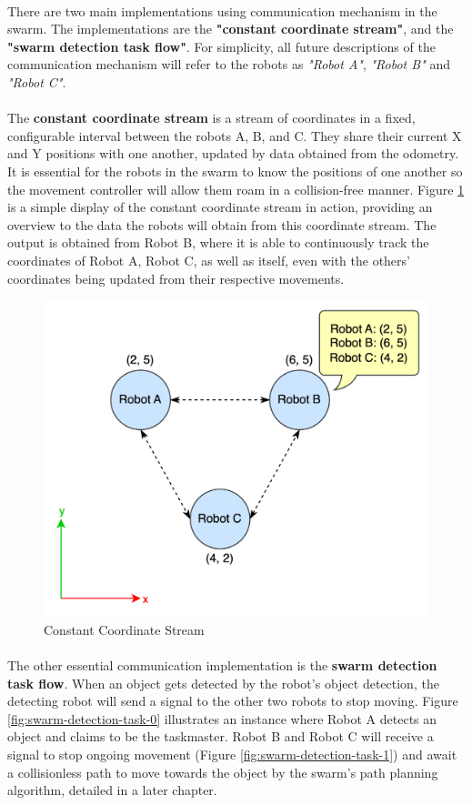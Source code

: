 \paragraph*{}
There are two main implementations using communication mechanism in the swarm. The implementations are the \textbf{"constant coordinate stream"}, and the \textbf{"swarm detection task flow"}. For simplicity, all future descriptions of the communication mechanism will refer to the robots as \textit{"Robot A"}, \textit{"Robot B"} and \textit{"Robot C"}.

\paragraph*{}
The \textbf{constant coordinate stream} is a stream of coordinates in a fixed, configurable interval between the robots A, B, and C. They share their current X and Y positions with one another, updated by data obtained from the odometry. It is essential for the robots in the swarm to know the positions of one another so the movement controller will allow them roam in a collision-free manner. Figure \ref{fig:coordinate-stream} is a simple display of the constant coordinate stream in action, providing an overview to the data the robots will obtain from this coordinate stream. The output is obtained from Robot B, where it is able to continuously track the coordinates of Robot A, Robot C, as well as itself, even with the others' coordinates being updated from their respective movements.

\begin{figure} [H]
    \centering
    \includegraphics[width=0.6\linewidth]{assets/images/communication/constant-coordinate-stream.png}
    \caption{Constant Coordinate Stream}
    \label{fig:coordinate-stream}
\end{figure}

\paragraph*{}
The other essential communication implementation is the \textbf{swarm detection task flow}. When an object gets detected by the robot's object detection, the detecting robot will send a signal to the other two robots to stop moving. Figure \ref{fig:swarm-detection-task-0} illustrates an instance where Robot A detects an object and claims to be the taskmaster. Robot B and Robot C will receive a signal to stop ongoing movement (Figure \ref{fig:swarm-detection-task-1}) and await a collisionless path to move towards the object by the swarm's path planning algorithm, detailed in a later chapter.

